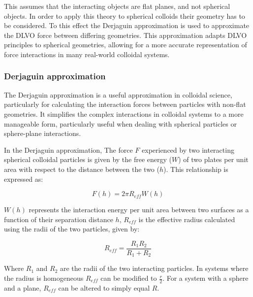 This assumes that the interacting objects are flat planes, and not spherical objects. In order to apply this theory to spherical colloids their geometry has to be considered. To this effect the Derjaguin approximation is used to approximate the DLVO force between differing geometries. This approximation adapts DLVO principles to spherical geometries, allowing for a more accurate representation of force interactions in many real-world colloidal systems. 

\subsubsection{Derjaguin approximation}

The Derjaguin approximation is a useful approximation in colloidal science, particularly for calculating the interaction forces between particles with non-flat geometries. It simplifies the complex interactions in colloidal systems to a more manageable form, particularly useful when dealing with spherical particles or sphere-plane interactions.

In the Derjaguin approximation, The force $F$ experienced by two interacting spherical colloidal particles is given by the free energy ($W$) of two plates per unit area with respect to the distance between the two ($h$). This relationship is expressed as:

\begin{equation} %
F(h) = 2 \pi R_{eff} W(h)
\end{equation}

$W(h)$ represents the interaction energy per unit area between two surfaces as a function of their separation distance $h$, $R_{eff}$ is the effective radius calculated using the radii of the two particles, given by:

\begin{equation} %
R_{eff} = \frac{R_1R_2}{R_1 + R_2}
\end{equation}

Where $R_1$ and $R_2$ are the radii of the two interacting particles. In systems where the radius is homogeneous $R_{eff}$ can be modified to $\frac{r}{2}$. For a system with a sphere and a plane, $R_{eff}$ can be altered to simply equal $R$.

